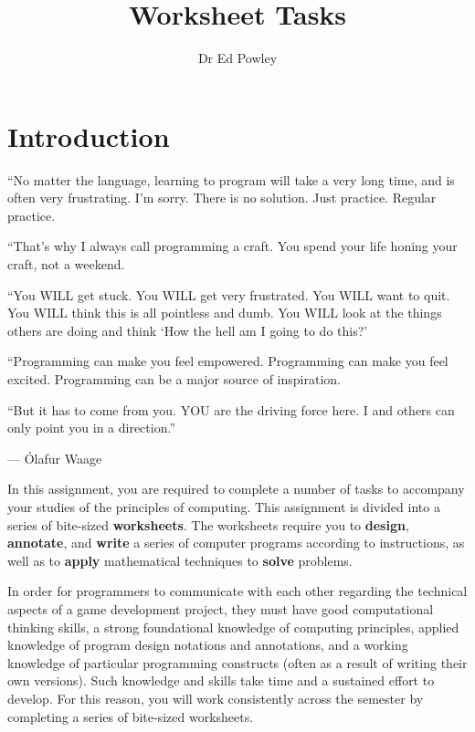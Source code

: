 \documentclass{../../fal_assignment}
\title{Worksheet Tasks}
\author{Dr Ed Powley}
\begin{document}
\maketitle

\section*{Introduction}

\begin{marginquote}
``No matter the language, learning to program will take a very long time, and is often very frustrating. I'm sorry. There is no solution. Just practice. Regular practice.

``That's why I always call programming a craft. You spend your life honing your craft, not a weekend.

``You WILL get stuck.
You WILL get very frustrated.
You WILL want to quit.
You WILL think this is all pointless and dumb.
You WILL look at the things others are doing and think `How the hell am I going to do this?'

``Programming can make you feel empowered.
Programming can make you feel excited.
Programming can be a major source of inspiration.

``But it has to come from you. YOU are the driving force here. I and others can only point you in a direction.''

\par --- \'Olafur Waage
\end{marginquote}

In this assignment, you are required to complete a number of tasks to accompany your studies of the principles of computing. This assignment is divided into a series of bite-sized \textbf{worksheets}. The worksheets require you to \textbf{design}, \textbf{annotate}, and \textbf{write} a series of computer programs according to instructions, as well as to \textbf{apply} mathematical techniques to \textbf{solve} problems.

In order for programmers to communicate with each other regarding the technical aspects of a game development project, they must have good computational thinking skills, a strong foundational knowledge of computing principles, applied knowledge of program design notations and annotations, and a working knowledge of particular programming constructs (often as a result of writing their own versions). Such knowledge and skills take time and a sustained effort to develop. For this reason, you will work consistently across the semester by completing a series of bite-sized worksheets.
\end{document}
